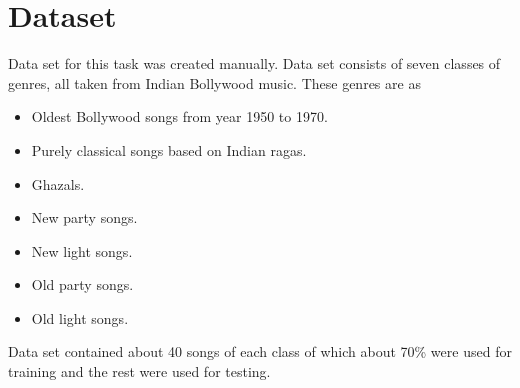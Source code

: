 \section{Dataset}
\label{sec:datagc}
Data set for this task was created manually. Data set consists of seven classes of genres, all taken from Indian Bollywood music. These genres are as
\begin{itemize}
\item Oldest Bollywood songs from year 1950 to 1970.
\item Purely classical songs based on Indian ragas.
\item Ghazals.
\item New party songs.
\item New light songs.
\item Old party songs.
\item Old light songs.
\end{itemize}
Data set contained about 40 songs of each class of which about 70\% were used for training and the rest were used for testing.

